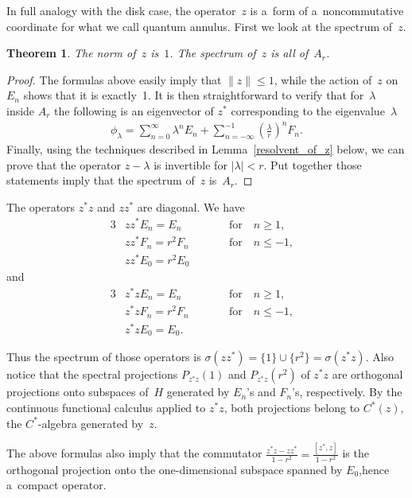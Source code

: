 \documentclass[pdftex]{sigma}
\numberwithin{equation}{section}
\newtheorem{Theorem}{Theorem}[section]
\begin{document}
In full analogy with the disk case, the operator~$z$ is a~form of a~noncommutative coordinate for what we call quantum
annulus.
First we look at the spectrum of~$z$.

\begin{Theorem}
The norm of~$z$ is~$1$.
The spectrum of~$z$ is all of~$A_{r}$.
\end{Theorem}

\begin{proof}
The formulas above easily imply that $\|z\|\leq 1$, while the action of~$z$ on $E_n$ shows that it is exactly~1.
It is then straightforward to verify that for~$\lambda$ inside $A_{r}$ the following is an eigenvector of $z^*$
corresponding to the eigenvalue~$\lambda$
\begin{gather*}
\phi_\lambda=\sum\limits_{n=0}^\infty \lambda^n E_n+\sum\limits_{n=-\infty}^{-1}\left(\frac{\lambda}{r}\right)^nF_n.
\end{gather*}
Finally, using the techniques described in Lemma~\ref{resolvent_of_z} below, we can prove that the operator $z-\lambda$
is invertible for $|\lambda|<r$.
Put together those statements imply that the spectrum of~$z$ is~$A_{r}$.
\end{proof}

The operators $z^*z$ and $zz^*$ are diagonal.
We have
\begin{alignat*}{3}
 & zz^*E_n=E_{n} \qquad && \text{for} \quad n\ge 1,&
\\
& zz^*F_n=r^2F_{n} \qquad && \text{for}\quad n\le -1,&
\\
& zz^*E_{0}=r^2E_0 &&&
\end{alignat*}
and
\begin{alignat*}{3}
& z^*zE_n=E_{n} \qquad && \text{for} \quad n\ge 1,&
\\
 & z^*zF_n=r^2F_{n} \qquad&& \text{for} \quad n\le -1,&
\\
& z^*zE_0=E_{0}.&&&
\end{alignat*}

Thus the spectrum of those operators is $\sigma(zz^*)=\{1\}\cup\{r^2\}=\sigma(z^*z)$.
Also notice that the spectral projections $P_{z^*z}(1)$ and $P_{z^*z}(r^2)$ of $z^*z$ are orthogonal projections onto
subspaces of~$H$ generated by $E_n$'s and $F_n$'s, respectively.
By the continuous functional calculus applied to $z^*z$, both projections belong to $C^*(z)$, the $C^*$-algebra
generated by~$z$.

\begin{Remark}
The above formulas also imply that the commutator $\frac{z^*z-zz^*}{1-r^2}=\frac{[z^*,z]}{1-r^2}$ is the ortho\-go\-nal
projection onto the one-dimensional subspace spanned by $E_0$,hence a~compact operator.
\end{Remark}
\end{document}
